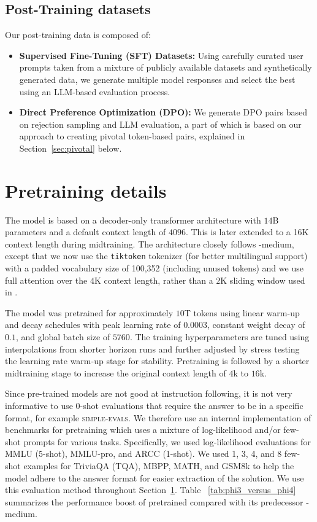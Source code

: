 \subsection{Post-Training datasets} 
Our post-training data is composed of:
\begin{itemize}
    \item \textbf{Supervised Fine-Tuning (SFT) Datasets:} Using carefully curated user prompts taken from a mixture of publicly available datasets and synthetically generated data, we generate multiple model responses and select the best using an LLM-based evaluation process. 
    \item \textbf{Direct Preference Optimization (DPO):} We generate DPO pairs based on rejection sampling and LLM evaluation, a part of which is based on our approach to creating pivotal token-based pairs, explained in Section~\ref{sec:pivotal} below.
\end{itemize}

\section{Pretraining details}\label{sec:pretrain}
The \model model is based on a decoder-only transformer architecture \cite{Vas17} with $14$B parameters and a default context length of $4096$.  This is later extended to a 16K context length during midtraining. The architecture closely follows \phithree{}-medium, except that we now use the \texttt{tiktoken} tokenizer (for better multilingual support) with a padded vocabulary size of {100,352} (including unused tokens) and we use full attention over the $4$K context length, rather than a $2$K sliding window  used in \phithreemed.

The model was pretrained for approximately $10$T tokens using linear warm-up and decay schedules with peak learning rate of $0.0003$, constant weight decay of $0.1$, and global batch size of $5760$. The training hyperparameters are tuned using interpolations from shorter horizon runs and further adjusted by stress testing the learning rate warm-up stage for stability. Pretraining is followed by a shorter midtraining stage to increase the original context length of $4$k to $16$k.

Since pre-trained models are not good at instruction following, it is not very informative to use 0-shot evaluations that require the answer to be in a specific format, for example \textsc{simple-evals}. We therefore use an internal implementation of benchmarks for pretraining which uses a mixture of log-likelihood and/or few-shot prompts for various tasks. Specifically, we used log-likelihood evaluations for MMLU (5-shot), MMLU-pro, and ARCC (1-shot). We used 1, 3, 4, and 8 few-shot examples for TriviaQA (TQA), MBPP, MATH, and GSM8k to help the model adhere to the answer format for easier extraction of the solution. We use this evaluation method throughout Section~\ref{sec:pretrain}. Table ~\ref{tab:phi3_versus_phi4} summarizes the performance boost of pretrained \model compared with its predecessor \phithree{}-medium.


